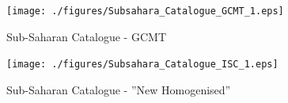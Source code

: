 \begin{figure}[htbp]
	\centering
		\texttt{[image: ./figures/Subsahara\_Catalogue\_GCMT\_1.eps]}
	\caption{Sub-Saharan Catalogue - GCMT}
	\label{fig:Subsahara_Catalogue_GCMT_1}
\end{figure}

\begin{figure}[htbp]
	\centering
		\texttt{[image: ./figures/Subsahara\_Catalogue\_ISC\_1.eps]}
	\caption{Sub-Saharan Catalogue - ''New Homogenised''}
	\label{fig:Subsahara_Catalogue_ISC_1}
\end{figure}


\cleardoublepage
